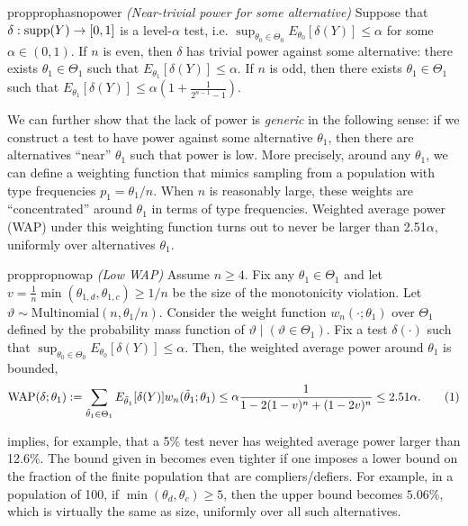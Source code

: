 \documentclass[12pt,reqno]{amsart}
\theoremstyle{theorem}
\theoremstyle{definition}
\newcommand\numberthis{\addtocounter{equation}{1}\tag{\theequation}}
\newcommand{\0}{\mathbf{0}}
\newcommand{\1}{\mathbf{1}}
\begin{document}
\begin{restatable}{prop}{prophasnopower}
\emph{(Near-trivial power for some alternative)}
Suppose that $\delta: \operatorname{supp}(Y) \to [0,1]$ is a level-$\alpha$ test, i.e. $\sup_{\theta_0
\in \Theta_0} E_{\theta_0}[\delta(Y)] \leq \alpha$ for some $\alpha \in (0,1)$. If $n$ is
even, then $\delta$ has trivial power against some alternative: there exists $\theta_1 \in
\Theta_1$ such that $E_{\theta_1}[\delta(Y)] \leq \alpha$. If $n$ is odd, then there
exists $\theta_1 \in \Theta_1$ such that $E_{\theta_1}[\delta(Y)] \leq \alpha \left(1 + \tfrac{1}
{2^{n-1}-1} \right)$.
\end{restatable}

We can further show that the lack of power is \emph{generic} in the following sense: if we
construct a test to have power against some alternative $\theta_1$, then there are
alternatives
``near'' $\theta_1$ such that power is low. More precisely, around any $\theta_1$,
we can define a weighting function that mimics sampling from a population with type
frequencies $p_1 = \theta_1/n$. When $n$ is reasonably large, these weights are
``concentrated'' around $\theta_1$ in terms of type frequencies. Weighted average power (WAP) under this weighting
function turns out to never be larger than 2.51$\alpha$, uniformly over alternatives
$\theta_1$.
\begin{restatable}{prop}{propnowap}
\label{prop:nowap}
\emph{(Low WAP)}    Assume $n \geq 4$. Fix any $\theta_1 \in \Theta_1$ and let $v = \tfrac{1}{n} \min(\theta_{1,d},
\theta_{1,c}) \ge 1/n$ be
the
size of the monotonicity violation. Let $\vartheta \sim
\mathrm{Multinomial} (n, \theta_1/n)$. 
Consider the weight function $w_n(\cdot; \theta_1)$ over
$\Theta_1$ defined by the probability mass function of $\vartheta \mid (\vartheta \in
\Theta_1)$. Fix a test $\delta(\cdot)$ such that $\sup_{\theta_0 \in\Theta_0} E_{\theta_0}[\delta
(Y)] \le \alpha$. Then, the weighted average power around $\theta_1$ is bounded,
\[
    \mathrm{WAP}(\delta; \theta_1) := \sum_{\tilde{\theta}_1 \in \Theta_1} E_{\tilde\theta_1}[\delta
    (Y)] w_n
    (\tilde{\theta}_1;\theta_1) \le \alpha  \frac{1}{1-2(1-v)^n+(1-2v)^n} \le 2.51 \alpha.
    \numberthis
    \label{eq:wap}
\]
\end{restatable}

 implies, for example, that a 5\% test never has weighted average power
larger than 12.6\%. The bound given in  becomes even tighter if one
imposes a lower bound on the fraction of the finite population that are compliers/defiers.
For example, in a population of 100, if $\min(\theta_d, \theta_c) \ge 5$, then the upper
bound becomes $5.06\%$, which is virtually the same as size, uniformly over all such
alternatives.
\end{document}
